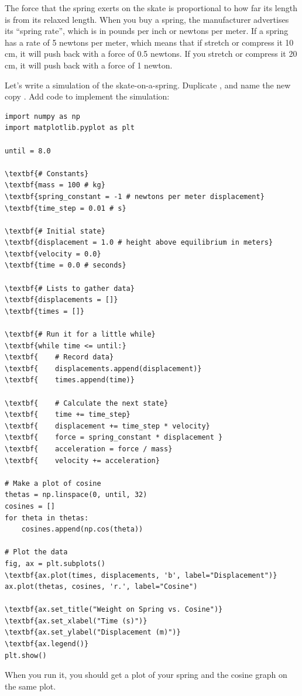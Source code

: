 The force that the spring exerts on the skate is proportional to how
far its length is from its relaxed length. When you buy a spring, the
manufacturer advertises its ``spring rate'', which is in pounds per
inch or newtons per meter.  If a spring has a rate of 5 newtons per
meter, which means that if stretch or compress it 10 cm, it will push
back with a force of 0.5 newtons. If you stretch or compress it 20 cm,
it will push back with a force of 1 newton.

Let's write a simulation of the skate-on-a-spring. Duplicate , and name the new copy .  Add code to implement the simulation:

\begin{Verbatim}[commandchars=\\\{\}]
import numpy as np
import matplotlib.pyplot as plt

until = 8.0

\textbf{# Constants}
\textbf{mass = 100 # kg}
\textbf{spring_constant = -1 # newtons per meter displacement}
\textbf{time_step = 0.01 # s}

\textbf{# Initial state}
\textbf{displacement = 1.0 # height above equilibrium in meters}
\textbf{velocity = 0.0}
\textbf{time = 0.0 # seconds}

\textbf{# Lists to gather data}
\textbf{displacements = []}
\textbf{times = []}

\textbf{# Run it for a little while}
\textbf{while time <= until:}
\textbf{    # Record data}
\textbf{    displacements.append(displacement)}
\textbf{    times.append(time)}

\textbf{    # Calculate the next state}
\textbf{    time += time_step}
\textbf{    displacement += time_step * velocity}
\textbf{    force = spring_constant * displacement }
\textbf{    acceleration = force / mass}
\textbf{    velocity += acceleration}

# Make a plot of cosine
thetas = np.linspace(0, until, 32)
cosines = []
for theta in thetas:
    cosines.append(np.cos(theta))

# Plot the data
fig, ax = plt.subplots()
\textbf{ax.plot(times, displacements, 'b', label="Displacement")}
ax.plot(thetas, cosines, 'r.', label="Cosine")

\textbf{ax.set_title("Weight on Spring vs. Cosine")}
\textbf{ax.set_xlabel("Time (s)")}
\textbf{ax.set_ylabel("Displacement (m)")}
\textbf{ax.legend()}
plt.show()
\end{Verbatim}
When you run it, you should get a plot of your spring and the cosine graph on the same plot.

